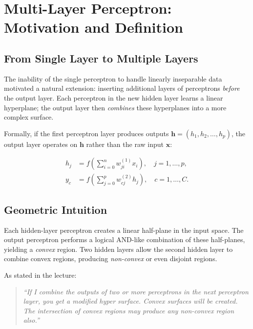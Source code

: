 \documentclass[12pt,a4paper]{article}
\begin{document}
\section{Multi-Layer Perceptron: Motivation and Definition}
\label{sec:mlp-motivation}

\subsection{From Single Layer to Multiple Layers}
\label{subsec:single-to-multi}

The inability of the single perceptron to handle linearly inseparable
data motivated a natural extension: inserting additional layers of
perceptrons \emph{before} the output layer.  Each perceptron in the new
hidden layer learns a linear hyperplane; the output layer then
\emph{combines} these hyperplanes into a more complex surface.

Formally, if the first perceptron layer produces outputs
$\mathbf{h} = (h_1, h_2, \ldots, h_p)$, the output layer operates on
$\mathbf{h}$ rather than the raw input $\mathbf{x}$:

\begin{align}
  \label{eq:mlp-forward}
  h_j &= f\!\left(\sum_{i=0}^{n} w_{ji}^{(1)} x_i\right),
    \quad j = 1, \ldots, p, \\[4pt]
  y_c &= f\!\left(\sum_{j=0}^{p} w_{cj}^{(2)} h_j\right),
    \quad c = 1, \ldots, C.
\end{align}

\subsection{Geometric Intuition}
\label{subsec:geometric-intuition}

Each hidden-layer perceptron creates a linear half-plane in the input
space.  The output perceptron performs a logical AND-like combination of
these half-planes, yielding a \emph{convex} region.  Two hidden layers
allow the second hidden layer to combine convex regions, producing
\emph{non-convex} or even disjoint regions.

As stated in the lecture:
\begin{quote}
\textit{``If I combine the outputs of two or more perceptrons in the next
perceptron layer, you get a modified hyper surface.  Convex surfaces will
be created.  The intersection of convex regions may produce any non-convex
region also.''}
\end{quote}
\end{document}
